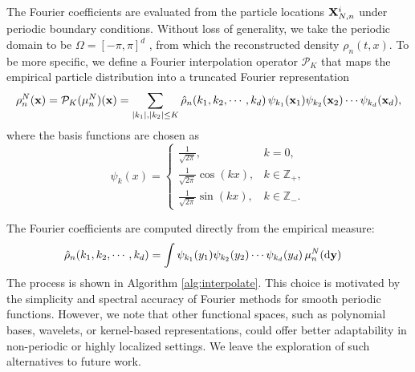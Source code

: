 \documentclass[a4paper,fleqn]{cas-sc}
\theoremstyle{definition}
\theoremstyle{remark}
\begin{document}
The Fourier coefficients are evaluated from the particle locations $\mathbf{X}_{N,n}^i$ under periodic boundary conditions. Without loss of generality, we take the periodic domain to be $\Omega=[-\pi,\pi]^d$ , from which the reconstructed density $\rho_n(t,x)$. To be more specific, we define a Fourier interpolation operator $\mathcal P_K$
that maps the empirical particle distribution into a truncated Fourier representation 
\[
\rho^N_n(\mathbf{x}) = \mathcal{P}_K(\mu^N_n)(\mathbf{x}) 
          = \sum_{\vert k_1\vert ,\vert k_2\vert \leq K} \hat{\rho}_n(k_1,k_2,\cdots,k_d)\,\psi_{k_1}(\mathbf{x}_1)\psi_{k_2}(\mathbf{x}_2)\cdots\psi_{k_d}(\mathbf{x}_d),
\]
where the basis functions are chosen as
\[
\psi_k(x) =
\begin{cases}
\frac{1}{\sqrt{2\pi}}, & k=0, \\
\frac{1}{\sqrt{2\pi}} \cos(k  x), & k \in \mathbb{Z}_+, \\
\frac{1}{\sqrt{2\pi}}\sin(k  x), & k \in \mathbb{Z}_- .
\end{cases}
\]

The Fourier coefficients are computed directly from the empirical measure:
\begin{equation}
\begin{aligned}
    \hat{\rho}_n(k_1,k_2,\cdots,k_d) &= \int \psi_{k_1}(y_1)\psi_{k_2}(y_2)\cdots \psi_{k_d}(y_d)\,\mu^N_n(\mathrm{d}\mathbf{y})
\end{aligned}
\label{eq:Fourier_mode}
\end{equation}
The process is shown in Algorithm \ref{alg:interpolate}. 
This choice is motivated by the simplicity and spectral accuracy of Fourier methods for smooth periodic functions. However, we note that other functional spaces, such as polynomial bases, wavelets, or kernel-based representations, could offer better adaptability in non-periodic or highly localized settings. We leave the exploration of such alternatives to future work.
\end{document}
